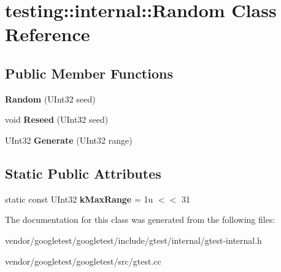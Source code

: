 \hypertarget{classtesting_1_1internal_1_1_random}{}\section{testing\+:\+:internal\+:\+:Random Class Reference}
\label{classtesting_1_1internal_1_1_random}
\subsection*{Public Member Functions}
\begin{DoxyCompactItemize}
\item 
\mbox{\label{classtesting_1_1internal_1_1_random_a6e112be5e7cce00551f6383025f69460}} 
{\bfseries Random} (U\+Int32 seed)
\item 
\mbox{\label{classtesting_1_1internal_1_1_random_adf2f24199318a46f885c78f50d89a69e}} 
void {\bfseries Reseed} (U\+Int32 seed)
\item 
\mbox{\label{classtesting_1_1internal_1_1_random_a9315b7fb621cbcfdf92ed4b5e584c0db}} 
U\+Int32 {\bfseries Generate} (U\+Int32 range)
\end{DoxyCompactItemize}
\subsection*{Static Public Attributes}
\begin{DoxyCompactItemize}
\item 
\mbox{\label{classtesting_1_1internal_1_1_random_a36d72dd7063d0b5338f229e75382fdd2}} 
static const U\+Int32 {\bfseries k\+Max\+Range} = 1u $<$$<$ 31
\end{DoxyCompactItemize}


The documentation for this class was generated from the following files\+:\begin{DoxyCompactItemize}
\item 
vendor/googletest/googletest/include/gtest/internal/gtest-\/internal.\+h\item 
vendor/googletest/googletest/src/gtest.\+cc\end{DoxyCompactItemize}
